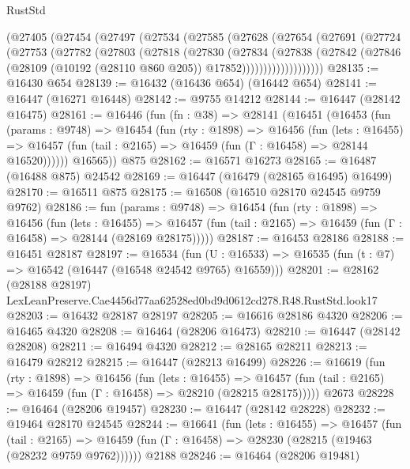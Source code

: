 \begin{lexlean}{RustStd}
\begin{coremodule}
    (@27405
      (@27454
        (@27497
          (@27534
            (@27585
              (@27628
                (@27654
                  (@27691
                    (@27724
                      (@27753
                        (@27782
                          (@27803
                            (@27818
                              (@27830
                                (@27834
                                  (@27838
                                    (@27842
                                      (@27846
                                        (@28109
                                          (@10192 (@28110 @860 @205))
                                          @17852)))))))))))))))))))
@28135 := @16430 @654
@28139 := @16432 (@16436 @654) (@16442 @654)
@28141 := @16447 (@16271 @16448)
@28142 := @9755 @14212
@28144 := @16447 (@28142 @16475)
@28161 := @16446
    (fun (fn : @38) =>
    @28141
      (@16451
        (@16453
          (fun (params : @9748) =>
          @16454
            (fun (rty : @1898) =>
            @16456
              (fun (lets : @16455) =>
              @16457 (fun (tail : @2165) => @16459 (fun (Γ : @16458) => @28144 @16520))))))
        @16565))
    @875
@28162 := @16571 @16273
@28165 := @16487 (@16488 @875) @24542
@28169 := @16447 (@16479 (@28165 @16495) @16499)
@28170 := @16511 @875
@28175 := @16508 (@16510 @28170 @24545 @9759 @9762)
@28186 := fun (params : @9748) =>
  @16454
    (fun (rty : @1898) =>
    @16456
      (fun (lets : @16455) =>
      @16457 (fun (tail : @2165) => @16459 (fun (Γ : @16458) => @28144 (@28169 @28175)))))
@28187 := @16453 @28186
@28188 := @16451 @28187
@28197 := @16534
    (fun (U : @16533) => @16535 (fun (t : @7) => @16542 (@16447 (@16548 @24542 @9765) @16559)))
@28201 := @28162
    (@28188 @28197)
    LexLeanPreserve.Cae4456d77aa62528ed0bd9d0612cd278.R48.RustStd.look17
@28203 := @16432 @28187 @28197
@28205 := @16616 @28186 @4320
@28206 := @16465 @4320
@28208 := @16464 (@28206 @16473)
@28210 := @16447 (@28142 @28208)
@28211 := @16494 @4320
@28212 := @28165 @28211
@28213 := @16479 @28212
@28215 := @16447 (@28213 @16499)
@28226 := @16619
    (fun (rty : @1898) =>
    @16456
      (fun (lets : @16455) =>
      @16457 (fun (tail : @2165) => @16459 (fun (Γ : @16458) => @28210 (@28215 @28175)))))
    @2673
@28228 := @16464 (@28206 @19457)
@28230 := @16447 (@28142 @28228)
@28232 := @19464 @28170 @24545
@28244 := @16641
    (fun (lets : @16455) =>
    @16457
      (fun (tail : @2165) =>
      @16459 (fun (Γ : @16458) => @28230 (@28215 (@19463 (@28232 @9759 @9762))))))
    @2188
@28246 := @16464 (@28206 @19481)

\end{coremodule}
\end{lexlean}
